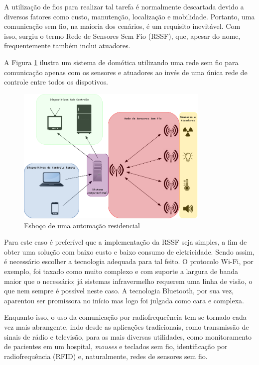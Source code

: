 A utilização de fios para realizar tal tarefa é normalmente descartada devido a diversos fatores como custo,
manutenção, localização e mobilidade. Portanto, uma comunicação sem fio, na maioria dos cenários, é um
requisito inevitável. Com isso, surgiu o termo Rede de Sensores Sem Fio (RSSF), que, apesar do nome,
frequentemente também inclui atuadores.  \cite{karl_willig2005}

A Figura \ref{figura:wsn} ilustra um sistema de domótica utilizando uma rede sem fio para comunicação apenas
com os sensores e atuadores ao invés de uma única rede de controle entre todos os dispotivos.

\begin{figure}[h]
	\centering
	\includegraphics[width=350]{../images/wsn.png}
	\caption{Esboço de uma automação residencial}
	\label{figura:wsn}
\end{figure}

Para este caso é preferível que a implementação da RSSF seja simples, a fim de obter uma solução com baixo
custo e baixo consumo de eletricidade. Sendo assim, é necessário escolher a tecnologia adequada para tal
feito. O protocolo Wi-Fi, por exemplo, foi taxado como muito complexo e com suporte a largura de banda maior
que o necessário; já sistemas infravermelho requerem uma linha de visão, o que nem sempre é possível neste
caso. A tecnologia Bluetooth, por sua vez, aparentou ser promissora no início mas logo foi julgada como cara e
complexa. \cite{sohraby_minoli_znati2007}

Enquanto isso, o uso da comunicação por radiofrequcência tem se tornado cada vez mais abrangente, indo desde
as aplicações tradicionais, como transmissão de sinais de rádio e televisão, para as mais diversas utilidades,
como monitoramento de pacientes em um hospital, \textit{mouses} e teclados sem fio, identificação por
radiofrequência (RFID) e, naturalmente, redes de sensores sem fio. \cite{misra2001}

